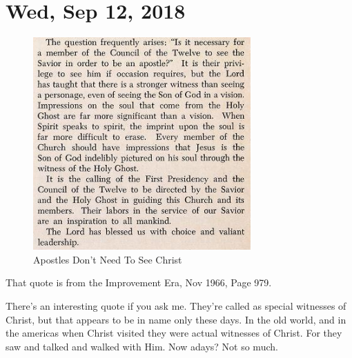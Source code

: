 \section{Wed, Sep 12, 2018}

\begin{figure}[h!]
  \centering
  \includegraphics[width=.5\linewidth]{2018/images/apostle.png}
  \caption{Apostles Don't Need To See Christ}
  \label{fig:apostle}
\end{figure}

That quote is from the Improvement Era, Nov 1966, Page 979.

There's an interesting quote if you ask me. They're called as special witnesses of
Christ, but that appears to be in name only these days. In the old world, and in the
americas when Christ visited they were actual witnesses of Christ. For they saw and
talked and walked with Him. Now adays? Not so much.